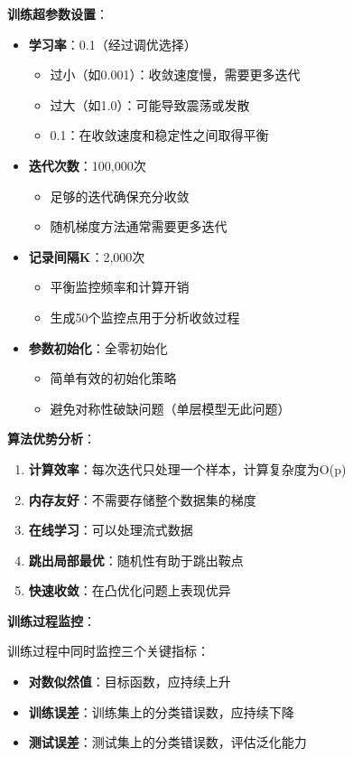 \documentclass[a4paper]{article}
\begin{document}
\textbf{训练超参数设置}：
\begin{itemize}
    \item \textbf{学习率}：0.1（经过调优选择）
    \begin{itemize}
        \item 过小（如0.001）：收敛速度慢，需要更多迭代
        \item 过大（如1.0）：可能导致震荡或发散
        \item 0.1：在收敛速度和稳定性之间取得平衡
    \end{itemize}
    \item \textbf{迭代次数}：100,000次
    \begin{itemize}
        \item 足够的迭代确保充分收敛
        \item 随机梯度方法通常需要更多迭代
    \end{itemize}
    \item \textbf{记录间隔K}：2,000次
    \begin{itemize}
        \item 平衡监控频率和计算开销
        \item 生成50个监控点用于分析收敛过程
    \end{itemize}
    \item \textbf{参数初始化}：全零初始化
    \begin{itemize}
        \item 简单有效的初始化策略
        \item 避免对称性破缺问题（单层模型无此问题）
    \end{itemize}
\end{itemize}

\textbf{算法优势分析}：
\begin{enumerate}
    \item \textbf{计算效率}：每次迭代只处理一个样本，计算复杂度为O(p)
    \item \textbf{内存友好}：不需要存储整个数据集的梯度
    \item \textbf{在线学习}：可以处理流式数据
    \item \textbf{跳出局部最优}：随机性有助于跳出鞍点
    \item \textbf{快速收敛}：在凸优化问题上表现优异
\end{enumerate}

\textbf{训练过程监控}：

训练过程中同时监控三个关键指标：
\begin{itemize}
    \item \textbf{对数似然值}：目标函数，应持续上升
    \item \textbf{训练误差}：训练集上的分类错误数，应持续下降
    \item \textbf{测试误差}：测试集上的分类错误数，评估泛化能力
\end{itemize}
\end{document}
